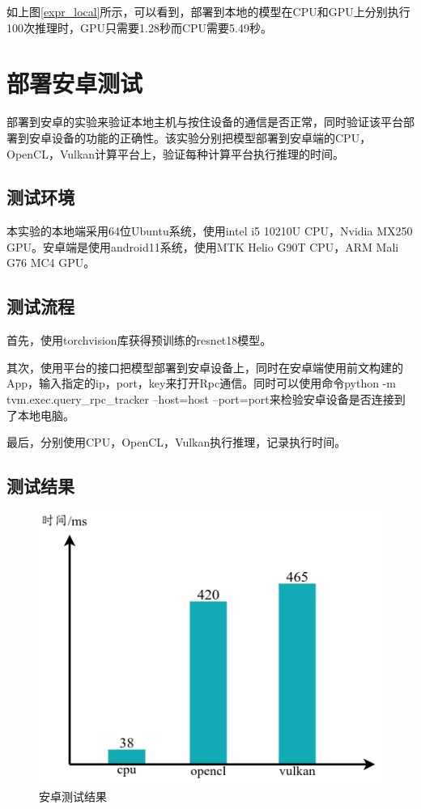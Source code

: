 如上图\ref{expr_local}所示，可以看到，部署到本地的模型在CPU和GPU上分别执行100次推理时，GPU只需要1.28秒而CPU需要5.49秒。


\section{部署安卓测试}

部署到安卓的实验来验证本地主机与按住设备的通信是否正常，同时验证该平台部署到安卓设备的功能的正确性。该实验分别把模型部署到安卓端的CPU，OpenCL，Vulkan计算平台上，验证每种计算平台执行推理的时间。

\subsection{测试环境}

本实验的本地端采用64位Ubuntu系统，使用intel i5 10210U CPU，Nvidia MX250 GPU。安卓端是使用android11系统，使用MTK Helio G90T CPU，ARM Mali G76 MC4 GPU。


\subsection{测试流程}

首先，使用torchvision库获得预训练的resnet18模型。

其次，使用平台的接口把模型部署到安卓设备上，同时在安卓端使用前文构建的App，输入指定的ip，port，key来打开Rpc通信。同时可以使用命令python -m tvm.exec.query\_rpc\_tracker --host=host --port=port来检验安卓设备是否连接到了本地电脑。

最后，分别使用CPU，OpenCL，Vulkan执行推理，记录执行时间。


\subsection{测试结果}

\begin{figure}[h!]
    \centering
    \includegraphics[width=180bp]{figure/expr_android.png}
    \caption{安卓测试结果}
    \label{expr_android}
\end{figure}

